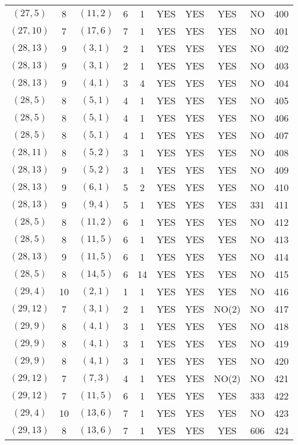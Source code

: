 \begin{longtable}{|c|c|c|c|c|c|c|c|c|c|}
$(27, 5)$ & 8 & $(11, 2)$ & 6 & 1 & YES & YES & YES & NO & 400\\
$(27, 10)$ & 7 & $(17, 6)$ & 7 & 1 & YES & YES & YES & NO & 401\\
$(28, 13)$ & 9 & $(3, 1)$ & 2 & 1 & YES & YES & YES & NO & 402\\
$(28, 13)$ & 9 & $(3, 1)$ & 2 & 1 & YES & YES & YES & NO & 403\\
$(28, 13)$ & 9 & $(4, 1)$ & 3 & 4 & YES & YES & YES & NO & 404\\
$(28, 5)$ & 8 & $(5, 1)$ & 4 & 1 & YES & YES & YES & NO & 405\\
$(28, 5)$ & 8 & $(5, 1)$ & 4 & 1 & YES & YES & YES & NO & 406\\
$(28, 5)$ & 8 & $(5, 1)$ & 4 & 1 & YES & YES & YES & NO & 407\\
$(28, 11)$ & 8 & $(5, 2)$ & 3 & 1 & YES & YES & YES & NO & 408\\
$(28, 13)$ & 9 & $(5, 2)$ & 3 & 1 & YES & YES & YES & NO & 409\\
$(28, 13)$ & 9 & $(6, 1)$ & 5 & 2 & YES & YES & YES & NO & 410\\
$(28, 13)$ & 9 & $(9, 4)$ & 5 & 1 & YES & YES & YES & 331 & 411\\
$(28, 5)$ & 8 & $(11, 2)$ & 6 & 1 & YES & YES & YES & NO & 412\\
$(28, 5)$ & 8 & $(11, 5)$ & 6 & 1 & YES & YES & YES & NO & 413\\
$(28, 13)$ & 9 & $(11, 5)$ & 6 & 1 & YES & YES & YES & NO & 414\\
$(28, 5)$ & 8 & $(14, 5)$ & 6 & 14 & YES & YES & YES & NO & 415\\
$(29, 4)$ & 10 & $(2, 1)$ & 1 & 1 & YES & YES & YES & NO & 416\\
$(29, 12)$ & 7 & $(3, 1)$ & 2 & 1 & YES & YES & NO(2) & NO & 417\\
$(29, 9)$ & 8 & $(4, 1)$ & 3 & 1 & YES & YES & YES & NO & 418\\
$(29, 9)$ & 8 & $(4, 1)$ & 3 & 1 & YES & YES & YES & NO & 419\\
$(29, 9)$ & 8 & $(4, 1)$ & 3 & 1 & YES & YES & YES & NO & 420\\
$(29, 12)$ & 7 & $(7, 3)$ & 4 & 1 & YES & YES & NO(2) & NO & 421\\
$(29, 12)$ & 7 & $(11, 5)$ & 6 & 1 & YES & YES & YES & 333 & 422\\
$(29, 4)$ & 10 & $(13, 6)$ & 7 & 1 & YES & YES & YES & NO & 423\\
$(29, 13)$ & 8 & $(13, 6)$ & 7 & 1 & YES & YES & YES & 606 & 424\\

\end{longtable}
